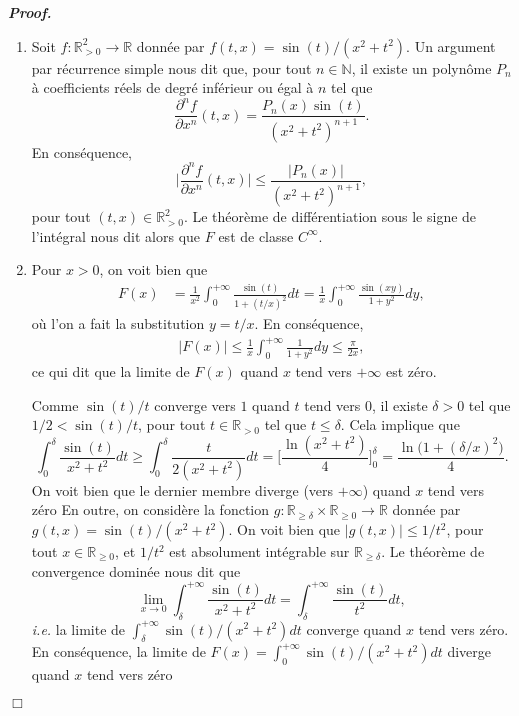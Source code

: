 \documentclass[11pt,a4paper]{article}
\newcommand{\NN}{\mathbb{N}}
\newcommand{\RR}{\mathbb{R}}
\newenvironment{preuve}[1][]
{\vskip 2mm  \noindent\emph{\bf Proof#1. }}{$\Box$ \vskip 2mm}
\let\geq\geqslant
\let\leq\leqslant
\begin{document}
	\begin{preuve}
		\begin{enumerate} 
			\item Soit $f : \RR_{>0}^{2} \rightarrow \RR$ donnée par $f(t,x) = \sin(t)/(x^2+t^2)$. 
			Un argument par récurrence simple nous dit que, pour tout $n \in \NN$, il existe un polynôme $P_{n}$ à coefficients réels de degré inférieur ou égal à $n$ tel que  
			\[     \frac{\partial^{n} f}{\partial x^{n}}(t,x) = \frac{P_{n}(x) \sin(t)}{(x^2+t^2)^{n+1}}.     \]
			En conséquence, 
			\[     \bigg| \frac{\partial^{n} f}{\partial x^{n}}(t,x) \bigg| \leq \frac{|P_{n}(x)|}{(x^2+t^2)^{n+1}},     \]
			pour tout $(t,x) \in \RR^{2}_{>0}$. 
			Le théorème de différentiation sous le signe de l'intégral nous dit alors que $F$ est de classe $C^{\infty}$. 
			
			\item Pour $x >0$, on voit bien que 
			\begin{align*}
			F(x) &= \frac{1}{x^{2}} \int_{0}^{+\infty} \frac{\sin (t)}{ 1+(t/x)^2} dt = \frac{1}{x} \int_{0}^{+\infty} \frac{\sin (x y)}{1+y^2} dy,
			\end{align*} 
			où l'on a fait la substitution $y = t/x$. 
			En conséquence, 
			\begin{align*}
			|F(x)| \leq \frac{1}{x} \int_{0}^{+\infty} \frac{1}{1+y^2} dy \leq \frac{\pi}{2 x},
			\end{align*} 
			ce qui dit que la limite de $F(x)$ quand $x$ tend vers $+ \infty$ est zéro. 
			
			Comme $\sin(t)/t$ converge vers $1$ quand $t$ tend vers $0$, il existe $\delta > 0$ tel que $1/2 < \sin(t)/t$, pour tout $t \in \RR_{>0}$ tel que $t \leq \delta$. 
			Cela implique que 
			\[     \int_{0}^{\delta} \frac{\sin (t)}{ x^2+t^2} dt \geq \int_{0}^{\delta} \frac{t}{2(x^2+t^2)} dt = \bigg[\frac{\ln(x^{2}+t^{2})}{4} \bigg]_{0}^{\delta} = \frac{\ln\big(1+(\delta/x)^{2}\big)}{4}.     \]
			On voit bien que le dernier membre diverge (vers $+\infty$) quand $x$ tend vers zéro 
			En outre, on considère la fonction $g : \RR_{\geq \delta} \times \RR_{\geq 0} \rightarrow \RR$ donnée par $g(t,x) = \sin (t)/(x^{2}+t^2)$. 
			On voit bien que $|g(t,x)| \leq 1/t^{2}$, pour tout $x \in \RR_{\geq 0}$, et $1/t^{2}$ est absolument intégrable sur $\RR_{\geq \delta}$. 
			Le théorème de convergence dominée nous dit que 
			\[     \underset{x \rightarrow 0}{\lim} \int_{\delta}^{+\infty} \frac{\sin (t)}{ x^2+t^2} dt = \int_{\delta}^{+\infty} \frac{\sin (t)}{t^2} dt,     \]
			\textit{i.e.} la limite de $\int_{\delta}^{+\infty} \sin (t)/(x^2+t^2) dt$ converge quand $x$ tend vers zéro. 
			En conséquence, la limite de $F(x) = \int_{0}^{+\infty} \sin (t)/(x^2+t^2) dt$ diverge quand $x$ tend vers zéro
			

\end{enumerate}
\end{preuve}
\end{document}
